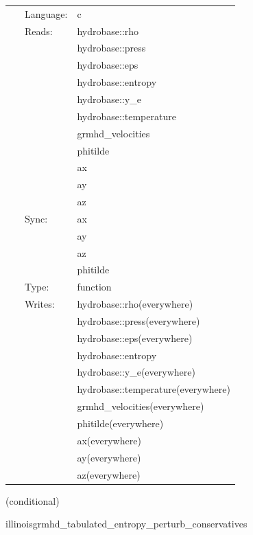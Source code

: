 \hspace{5mm}

 \begin{tabular*}{160mm}{cll} 
~ & Language:  & c \\ 
~ & Reads:  & hydrobase::rho \\ 
~& ~ &hydrobase::press\\ 
~& ~ &hydrobase::eps\\ 
~& ~ &hydrobase::entropy\\ 
~& ~ &hydrobase::y\_e\\ 
~& ~ &hydrobase::temperature\\ 
~& ~ &grmhd\_velocities\\ 
~& ~ &phitilde\\ 
~& ~ &ax\\ 
~& ~ &ay\\ 
~& ~ &az\\ 
~ & Sync:  & ax \\ 
~& ~ &ay\\ 
~& ~ &az\\ 
~& ~ &phitilde\\ 
~ & Type:  & function \\ 
~ & Writes:  & hydrobase::rho(everywhere) \\ 
~& ~ &hydrobase::press(everywhere)\\ 
~& ~ &hydrobase::eps(everywhere)\\ 
~& ~ &hydrobase::entropy\\ 
~& ~ &hydrobase::y\_e(everywhere)\\ 
~& ~ &hydrobase::temperature(everywhere)\\ 
~& ~ &grmhd\_velocities(everywhere)\\ 
~& ~ &phitilde(everywhere)\\ 
~& ~ &ax(everywhere)\\ 
~& ~ &ay(everywhere)\\ 
~& ~ &az(everywhere)\\ 
\end{tabular*} 


\vspace{5mm}

   (conditional) 

\hspace{5mm} illinoisgrmhd\_tabulated\_entropy\_perturb\_conservatives 

\hspace{5mm}{\it entropy+tabulated version of illinoisgrmhd\_perturb\_conservatives } 



